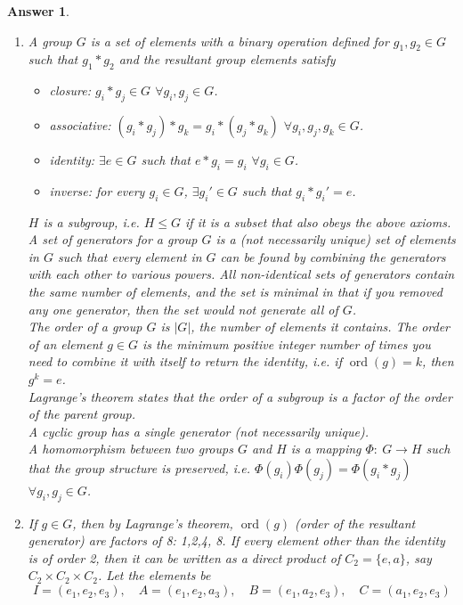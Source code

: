 \documentclass[a4paper]{article}
\DeclareMathOperator{\ord}{ord}
\newtheorem{ans}{Answer}[section]
\theoremstyle{new}
\begin{document}
\begin{ans}\leavevmode
\begin{enumerate}[label=(\alph*)]
\item A group $G$ is a set of elements with a binary operation defined for $g_1,g_2\in G$ such that $g_1*g_2$ and the resultant group elements satisfy
\begin{itemize}
    \item closure: $g_i*g_j\in G$ $\forall g_i,g_j\in G$.
    \item associative: $(g_i*g_j)*g_k=g_i*(g_j*g_k)$ $\forall g_i,g_j,g_k\in G$.
    \item identity: $\exists e\in G$ such that $e*g_i=g_i$ $\forall g_i\in G$.
    \item inverse: for every $g_i\in G$, $\exists g_i'\in G$ such that $g_i*g_i'=e$.
\end{itemize}
$H$ is a subgroup, i.e. $H\leq G$ if it is a subset that also obeys the above axioms.\\[5pt]
A set of generators for a group $G$ is a (not necessarily unique) set of elements in $G$ such that every element in $G$ can be found by combining the generators with each other to various powers. All non-identical sets of generators contain the same number of elements, and the set is minimal in that if you removed any one generator, then the set would not generate all of $G$.\\[5pt]
The order of a group $G$ is $|G|$, the number of elements it contains. The order of an element $g\in G$ is the minimum positive integer number of times you need to combine it with itself to return the identity, i.e. if $\ord(g)=k$, then $g^k=e$.\\[5pt]
Lagrange's theorem states that the order of a subgroup is a factor of the order of the parent group.\\[5pt]
A cyclic group has a single generator (not necessarily unique).\\[5pt]
A homomorphism between two groups $G$ and $H$ is a mapping $\Phi:~G\rightarrow H$ such that the group structure is preserved, i.e. $\Phi(g_i)\Phi(g_j)=\Phi(g_i*g_j)$ $\forall g_i,g_j\in G$.
\item If $g\in G$, then by Lagrange's theorem, $\ord(g)$ (order of the resultant generator) are factors of 8: 1,2,4, 8. If every element other than the identity is of order 2, then it can be written as a direct product of $C_2=\{e,a\}$, say $C_2\times C_2\times C_2$. Let the elements be
$$I=(e_1,e_2,e_3),\quad A=(e_1,e_2,a_3),\quad B=(e_1,a_2,e_3),\quad C=(a_1,e_2,e_3)$$

\end{enumerate}
\end{ans}
\end{document}
